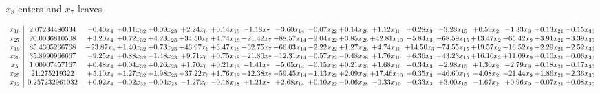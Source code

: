 \documentclass[9pt]{article}
\begin{document}
 $ x_{8} $ enters and $ x_{7} $ leaves 

 \[\begin{array}{c| c c@{\hskip 2pt} c@{\hskip 2pt} c@{\hskip 2pt} c@{\hskip 2pt} c@{\hskip 2pt} c@{\hskip 2pt} c@{\hskip 2pt} c@{\hskip 2pt} c@{\hskip 2pt} c@{\hskip 2pt} c@{\hskip 2pt} c@{\hskip 2pt} c@{\hskip 2pt} c@{\hskip 2pt} c@{\hskip 2pt} c@{\hskip 2pt} }
 x_{16}   &  2.07234480334 & -0.40 x_{4} & +  0.11 x_{32} & +  0.09 x_{23} & +  2.24 x_{6} & +  0.14 x_{18} & -1.18 x_{7} & -3.60 x_{14} & -0.07 x_{22} & +  0.14 x_{28} & +  1.12 x_{10} & +  0.28 x_{3} & -3.28 x_{15} & +  0.59 x_{2} & -1.33 x_{9} & +  0.13 x_{21} & -0.15 x_{30}\\
 x_{27}   &  20.0036810508 & +  3.20 x_{4} & +  0.72 x_{32} & +  4.23 x_{23} & + 34.50 x_{6} & +  4.74 x_{18} & -21.42 x_{7} & -88.57 x_{14} & -2.04 x_{22} & +  3.85 x_{28} & + 42.81 x_{10} & -5.84 x_{3} & -68.59 x_{15} & + 13.47 x_{2} & -65.42 x_{9} & +  3.91 x_{21} & -3.39 x_{30}\\
 x_{19}   &  85.4305266768 & -23.87 x_{4} & +  1.40 x_{32} & +  0.73 x_{23} & + 43.97 x_{6} & +  3.47 x_{18} & -32.75 x_{7} & -66.03 x_{14} & -2.22 x_{22} & +  1.27 x_{28} & +  4.74 x_{10} & + 14.50 x_{3} & -74.55 x_{15} & + 19.57 x_{2} & -16.52 x_{9} & +  2.29 x_{21} & -2.52 x_{30}\\
 x_{20}   &  35.8990966667 & -9.25 x_{4} & +  0.88 x_{32} & -1.48 x_{23} & +  9.71 x_{6} & +  0.75 x_{18} & -21.80 x_{7} & -12.31 x_{14} & -0.57 x_{22} & -0.48 x_{28} & +  1.76 x_{10} & +  6.36 x_{3} & -43.23 x_{15} & + 16.10 x_{2} & + 11.09 x_{9} & +  0.10 x_{21} & -0.06 x_{30}\\
 x_{5}   &  1.00907457167 & +  0.48 x_{4} & +  0.04 x_{32} & +  0.26 x_{23} & +  1.70 x_{6} & +  0.21 x_{18} & -1.41 x_{7} & -5.05 x_{14} & -0.15 x_{22} & +  0.21 x_{28} & +  1.68 x_{10} & -0.34 x_{3} & -2.98 x_{15} & +  1.30 x_{2} & -2.79 x_{9} & +  0.18 x_{21} & -0.17 x_{30}\\
 x_{25}   &  21.275219322 & +  5.10 x_{4} & +  1.27 x_{32} & +  1.98 x_{23} & + 37.22 x_{6} & +  1.76 x_{18} & -12.38 x_{7} & -59.45 x_{14} & -1.13 x_{22} & +  2.09 x_{28} & + 17.46 x_{10} & +  0.35 x_{3} & -46.60 x_{15} & -4.08 x_{2} & -21.44 x_{9} & +  1.86 x_{21} & -2.36 x_{30}\\
 x_{12}   &  0.257232961032 & +  0.92 x_{4} & -0.02 x_{32} & -0.04 x_{23} & -1.27 x_{6} & -0.18 x_{18} & +  1.21 x_{7} & +  2.68 x_{14} & +  0.10 x_{22} & -0.06 x_{28} & -0.33 x_{10} & -0.33 x_{3} & +  3.00 x_{15} & -1.67 x_{2} & +  0.96 x_{9} & -0.07 x_{21} & +  0.08 x_{30}\\

\end{array}\]
\end{document}
